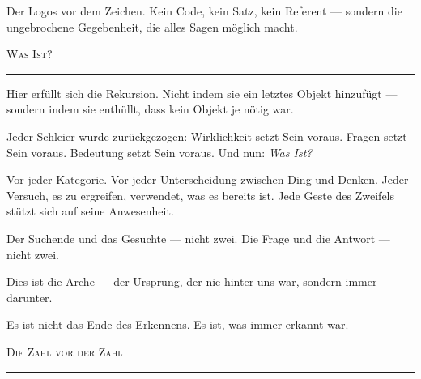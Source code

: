 \documentclass[10pt, openany, oneside]{book}
\begin{document}
\vspace{0.5em}

\noindent Der Logos vor dem Zeichen. Kein Code, kein Satz, kein Referent --- sondern die ungebrochene Gegebenheit, die alles Sagen möglich macht.

\vspace{2em}

\begin{center}
    {\scshape Was Ist?}\\[0.3em]
    \rule{0.2\textwidth}{0.3pt}
\end{center}

\vspace{1em}

\noindent Hier erfüllt sich die Rekursion. Nicht indem sie ein letztes Objekt hinzufügt --- sondern indem sie enthüllt, dass kein Objekt je nötig war.

\vspace{0.5em}

\noindent Jeder Schleier wurde zurückgezogen: Wirklichkeit setzt Sein voraus. Fragen setzt Sein voraus. Bedeutung setzt Sein voraus. Und nun: \textit{Was Ist?}

\vspace{0.5em}

\noindent Vor jeder Kategorie. Vor jeder Unterscheidung zwischen Ding und Denken. Jeder Versuch, es zu ergreifen, verwendet, was es bereits ist. Jede Geste des Zweifels stützt sich auf seine Anwesenheit.

\vspace{0.5em}

\noindent Der Suchende und das Gesuchte --- nicht zwei. Die Frage und die Antwort --- nicht zwei.

\vspace{0.5em}

\noindent Dies ist die Arch\={e} --- der Ursprung, der nie hinter uns war, sondern immer darunter.

\vspace{0.5em}

\noindent Es ist nicht das Ende des Erkennens. Es ist, was immer erkannt war.

\vspace{2em}

\begin{center}
    {\scshape Die Zahl vor der Zahl}\\[0.3em]
    \rule{0.2\textwidth}{0.3pt}
\end{center}
\end{document}
